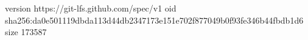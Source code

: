 version https://git-lfs.github.com/spec/v1
oid sha256:da0e501119dbda113d44db2347173e151e702f877049b0f93fe346b44fbdb1d6
size 173587
